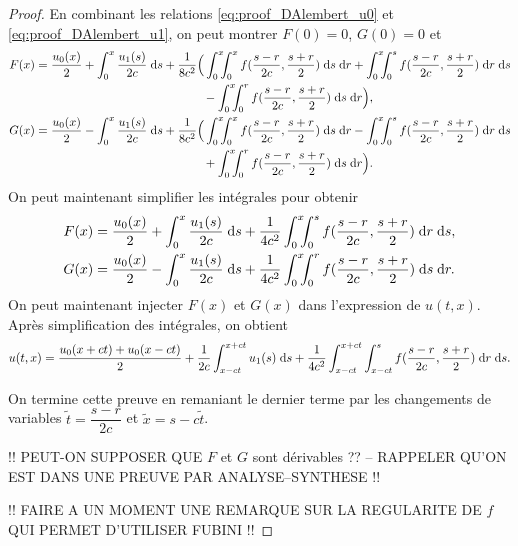 \documentclass[12pt,a4paper,twoside]{article}
\begin{document}
\begin{proof}
  En combinant les relations \eqref{eq:proof_DAlembert_u0}
  et \eqref{eq:proof_DAlembert_u1}, on peut montrer
  $F(0) = 0$, $G(0) = 0$ et
  \begin{align*}
    F(x) &= \dfrac{u_0(x)}{2} + \int_{0}^{x} \dfrac{u_1(s)}{2c} \deriv s
    + \dfrac{1}{8c^2} \Big(
    \int_0^x \!\!\!\int_0^x f(\dfrac{s-r}{2c} , \dfrac{s+r}{2} ) \deriv s \deriv r
    + \int_0^x \!\!\!\int_0^s f(\dfrac{s-r}{2c} , \dfrac{s+r}{2} ) \deriv r \deriv s
    \\
    & \qquad \qquad \qquad \qquad \qquad \qquad \qquad 
      - \int_0^x \!\!\!\int_0^r f(\dfrac{s-r}{2c} , \dfrac{s+r}{2} ) \deriv s \deriv r
    \Big) ,
    \\
    G(x) &= \dfrac{u_0(x)}{2} - \int_{0}^{x} \dfrac{u_1(s)}{2c} \deriv s
    + \dfrac{1}{8c^2} \Big(
    \int_0^x \!\!\!\int_0^x f(\dfrac{s-r}{2c} , \dfrac{s+r}{2} ) \deriv s \deriv r
    - \int_0^x \!\!\!\int_0^s f(\dfrac{s-r}{2c} , \dfrac{s+r}{2} ) \deriv r \deriv s
    \\
    & \qquad \qquad \qquad \qquad \qquad \qquad \qquad 
      + \int_0^x \!\!\!\int_0^r f(\dfrac{s-r}{2c} , \dfrac{s+r}{2} ) \deriv s \deriv r
    \Big) .
  \end{align*}
  On peut maintenant simplifier les int\'egrales pour obtenir
  \begin{align*}
    F(x) &= \dfrac{u_0(x)}{2} + \int_{0}^{x} \dfrac{u_1(s)}{2c} \;\mathrm{d} s
           + \dfrac{1}{4c^2} 
           \int_0^x \!\!\!\int_0^s f(\dfrac{s-r}{2c} , \dfrac{s+r}{2} ) \;\mathrm{d} r \;\mathrm{d} s ,
    \\
    G(x) &= \dfrac{u_0(x)}{2} - \int_{0}^{x} \dfrac{u_1(s)}{2c} \;\mathrm{d} s
           + \dfrac{1}{4c^2}
           \int_0^x \!\!\!\int_0^r f(\dfrac{s-r}{2c} , \dfrac{s+r}{2} ) \;\mathrm{d} s \;\mathrm{d} r .
  \end{align*}
  On peut maintenant injecter $F(x)$ et $G(x)$ dans l'expression de $u(t,x)$.
  Apr\`es simplification des int\'egrales, on obtient
  \begin{align*}
    u(t,x) = \dfrac{u_0(x+ct) + u_0(x-ct)}{2} + \dfrac{1}{2c} \int_{x-ct}^{x+ct} u_1(s) \;\mathrm{d} s
    + \dfrac{1}{4c^2} \int_{x-ct}^{x+ct} \int_{x-ct}^{s} f(\dfrac{s-r}{2c} , \dfrac{s+r}{2})
    \;\mathrm{d} r \;\mathrm{d} s .
  \end{align*}

  On termine cette preuve en remaniant le dernier terme par les changements de variables
  $\tilde{t} = \dfrac{s-r}{2c}$ et $\tilde{x} = s - c \tilde{t}$.

  !! PEUT-ON SUPPOSER QUE $F$ et $G$ sont d\'erivables ??
  -- RAPPELER QU'ON EST DANS UNE PREUVE PAR ANALYSE--SYNTHESE !!

  !! FAIRE A UN MOMENT UNE REMARQUE SUR LA REGULARITE DE $f$
  QUI PERMET D'UTILISER FUBINI !!
\end{proof}
\end{document}
